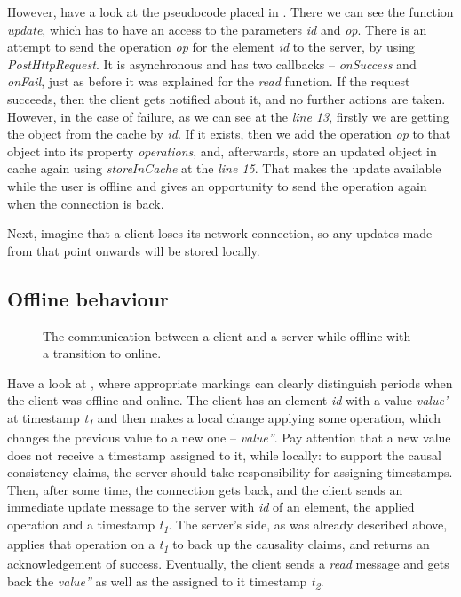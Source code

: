 However, have a look at the pseudocode placed in . There we can see the function \textit{update}, which has to have an access to the parameters \textit{id} and \textit{op}. There is an attempt to send the operation \textit{op} for the element \textit{id} to the server, by using \textit{PostHttpRequest}. It is asynchronous and has two callbacks -- \textit{onSuccess} and \textit{onFail}, just as before it was explained for the \textit{read} function. If the request succeeds, then the client gets notified about it, and no further actions are taken. However, in the case of failure, as we can see at the \textit{line 13}, firstly we are getting the object from the cache by \textit{id}. If it exists, then we add the operation \textit{op} to that object into its property \textit{operations}, and, afterwards, store an updated object in cache again using \textit{storeInCache} at the \textit{line 15}. That makes the update available while the user is offline and gives an opportunity to send the operation again when the connection is back.

Next, imagine that a client loses its network connection, so any updates made from that point onwards will be stored locally.  

\subsection*{Offline behaviour}

\begin{figure}[!htb]
    \begin{center}
    \def\svgwidth{\linewidth}
    
    \caption {The communication between a client and a server while offline with a transition to online.}
    \label{fig:design4}
\end{center}
\end{figure}

Have a look at , where appropriate markings can clearly distinguish periods when the client was offline and online. The client has an element \textit{id} with a value \textit{value'} at timestamp \textit{t\textsubscript{1}} and then makes a local change applying some operation, which changes the previous value to a new one -- \textit{value''}. Pay attention that a new value does not receive a timestamp assigned to it, while locally: to support the causal consistency claims, the server should take responsibility for assigning timestamps. Then, after some time, the connection gets back, and the client sends an immediate update message to the server with \textit{id} of an element, the applied operation and a timestamp \textit{t\textsubscript{1}}. The server's side, as was already described above, applies that operation on a \textit{t\textsubscript{1}} to back up the causality claims, and returns an acknowledgement of success. Eventually, the client sends a \textit{read} message and gets back the \textit{value''} as well as the assigned to it timestamp \textit{t\textsubscript{2}}.


